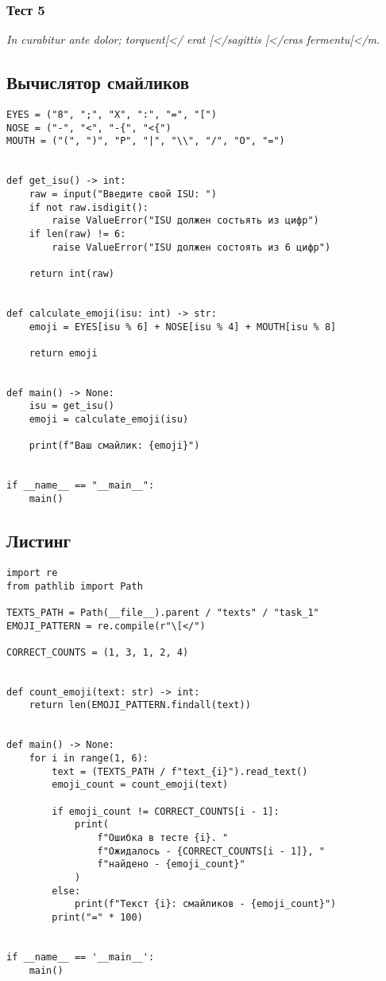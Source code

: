 \subsubsection*{Тест 5}
\textit{In curabitur ante dolor; torquent[</ erat [</sagittis [</cras fermentu[</m.}

\subsection*{Вычислятор смайликов}
\begin{verbatim}
EYES = ("8", ";", "X", ":", "=", "[")
NOSE = ("-", "<", "-{", "<{")
MOUTH = ("(", ")", "P", "|", "\\", "/", "O", "=")
		
		
def get_isu() -> int:
    raw = input("Введите свой ISU: ")
    if not raw.isdigit():
        raise ValueError("ISU должен состьять из цифр")
    if len(raw) != 6:
        raise ValueError("ISU должен состоять из 6 цифр")

    return int(raw)

		
def calculate_emoji(isu: int) -> str:
    emoji = EYES[isu % 6] + NOSE[isu % 4] + MOUTH[isu % 8]

    return emoji
		
		
def main() -> None:
    isu = get_isu()
    emoji = calculate_emoji(isu)
		
    print(f"Ваш смайлик: {emoji}")
		
		
if __name__ == "__main__":
    main()

\end{verbatim}

\subsection*{Листинг}
\begin{verbatim}
import re
from pathlib import Path

TEXTS_PATH = Path(__file__).parent / "texts" / "task_1"
EMOJI_PATTERN = re.compile(r"\[</")

CORRECT_COUNTS = (1, 3, 1, 2, 4)


def count_emoji(text: str) -> int:
    return len(EMOJI_PATTERN.findall(text))


def main() -> None:
    for i in range(1, 6):
        text = (TEXTS_PATH / f"text_{i}").read_text()
        emoji_count = count_emoji(text)

        if emoji_count != CORRECT_COUNTS[i - 1]:
            print(
                f"Ошибка в тесте {i}. "
                f"Ожидалось - {CORRECT_COUNTS[i - 1]}, "
                f"найдено - {emoji_count}"
            )
        else:
            print(f"Текст {i}: смайликов - {emoji_count}")
        print("=" * 100)


if __name__ == '__main__':
    main()
\end{verbatim}

